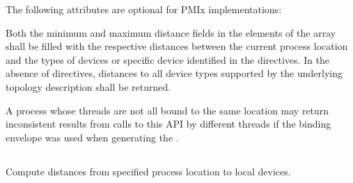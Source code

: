 \begin{arglist}
\end{arglist}

\returnsimple

\optattrstart
The following attributes are optional for \ac{PMIx} implementations:


\optattrend

\descr

Both the minimum and maximum distance fields in the elements of the array shall be filled with the respective distances between the current process location and the types of devices or specific device identified in the  directives. In the absence of directives, distances to all device types supported by the underlying topology description shall be returned.

\adviceuserstart
A process whose threads are not all bound to the same location may return inconsistent results from calls to this \ac{API} by different threads if the  binding envelope was used when generating the .
\adviceuserend


\subsection{}

\summary

Compute distances from specified process location to local devices.

\format

